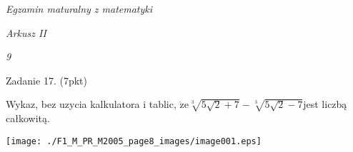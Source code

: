 \documentclass[a4paper,12pt]{article}
\begin{document}
{\it Egzamin maturalny z matematyki}

{\it Arkusz II}

{\it 9}

Zadanie 17. (7pkt)

Wykaz, bez uzycia kalkulatora i tablic, $\dot{\mathrm{z}}\mathrm{e}\sqrt[3]{5\sqrt{2}+7}-\sqrt[3]{5\sqrt{2}-7}$jest liczbą całkowitą.
\begin{center}
\texttt{[image: ./F1\_M\_PR\_M2005\_page8\_images/image001.eps]}
\end{center}
\end{document}
